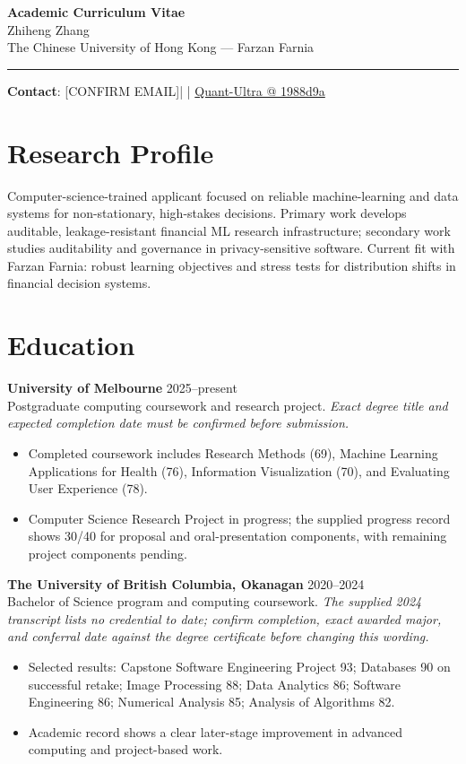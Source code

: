 \documentclass[11pt]{article}
\makeatletter
\newcommand{\ApplicantName}{Zhiheng Zhang}
\newcommand{\ApplicantEmail}{[CONFIRM EMAIL]}
\newcommand{\ApplicantPhone}{[CONFIRM PHONE]}
\newcommand{\ApplicantGitHub}{\href{https://github.com/zhiheng-zhang-Mera/Quant-Ultra/tree/1988d9a8530da91a8158de864d098ea869098923}{Quant-Ultra @ 1988d9a}}
\makeatother
\begin{document}
\begin{center}
{\LARGE\bfseries Academic Curriculum Vitae}\\[0.25em]
{\large \ApplicantName}\\
The Chinese University of Hong Kong --- Farzan Farnia
\end{center}
\vspace{0.35em}\hrule\vspace{0.65em}

\textbf{Contact}: \ApplicantEmail\quad | \quad \ApplicantPhone\quad | \quad \ApplicantGitHub

\section*{Research Profile}
Computer-science-trained applicant focused on reliable machine-learning and data systems for non-stationary, high-stakes decisions. Primary work develops auditable, leakage-resistant financial ML research infrastructure; secondary work studies auditability and governance in privacy-sensitive software. Current fit with Farzan Farnia: robust learning objectives and stress tests for distribution shifts in financial decision systems.

\section*{Education}
\textbf{University of Melbourne} \hfill 2025--present\\
Postgraduate computing coursework and research project. \textit{Exact degree title and expected completion date must be confirmed before submission.}
\begin{itemize}
\item Completed coursework includes Research Methods (69), Machine Learning Applications for Health (76), Information Visualization (70), and Evaluating User Experience (78).
\item Computer Science Research Project in progress; the supplied progress record shows 30/40 for proposal and oral-presentation components, with remaining project components pending.
\end{itemize}

\textbf{The University of British Columbia, Okanagan} \hfill 2020--2024\\
Bachelor of Science program and computing coursework. \textit{The supplied 2024 transcript lists no credential to date; confirm completion, exact awarded major, and conferral date against the degree certificate before changing this wording.}
\begin{itemize}
\item Selected results: Capstone Software Engineering Project 93; Databases 90 on successful retake; Image Processing 88; Data Analytics 86; Software Engineering 86; Numerical Analysis 85; Analysis of Algorithms 82.
\item Academic record shows a clear later-stage improvement in advanced computing and project-based work.
\end{itemize}
\end{document}
